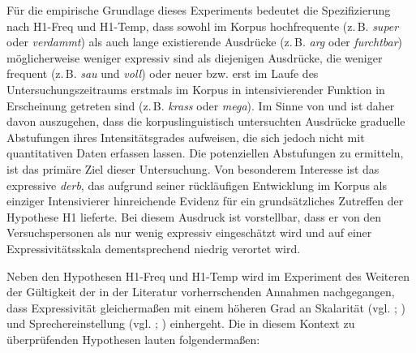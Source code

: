 \noindent Für die empirische Grundlage dieses Experiments bedeutet die Spezifizierung nach H1-Freq und H1-Temp, dass sowohl im Korpus hochfrequente (z.\,B. \textit{super} oder \textit{verdammt}) als auch lange existierende Ausdrücke (z.\,B. \textit{arg} oder \textit{furchtbar}) möglicherweise weniger expressiv sind als diejenigen Ausdrücke, die weniger frequent (z.\,B. \textit{sau} und \textit{voll}) oder neuer bzw. erst im Laufe des Untersuchungszeitraums erstmals im Korpus in intensivierender Funktion in Erscheinung getreten sind (z.\,B. \textit{krass} oder \textit{mega}). Im Sinne von \citet[87]{Biedermann.1969} und \citet[408]{Breindl.2007} ist daher davon auszugehen, dass die korpuslinguistisch untersuchten Ausdrücke graduelle Abstufungen ihres Intensitätsgrades aufweisen, die sich jedoch nicht mit quantitativen Daten erfassen lassen. Die potenziellen Abstufungen zu ermitteln, ist das primäre Ziel dieser Untersuchung. Von besonderem Interesse ist das expressive \textit{derb}, das aufgrund seiner rückläufigen Entwicklung im Korpus als einziger Intensivierer hinreichende Evidenz für ein grundsätzliches Zutreffen der Hypothese H1 lieferte. Bei diesem Ausdruck ist vorstellbar, dass er von den Versuchspersonen als nur wenig expressiv eingeschätzt wird und auf einer Expressivitätsskala dementsprechend niedrig verortet wird.






Neben den Hypothesen H1-Freq und H1-Temp wird im Experiment des Weiteren der Gültigkeit der in der Literatur vorherrschenden Annahmen nachgegangen, dass Expressivität gleichermaßen mit einem höheren Grad an Skalarität (vgl. {\citealt[22]{Paradis.1997}}; {\citealt[133]{Gutzmann.2019a}}) und Sprechereinstellung (vgl. {\citealt[315]{Lang.1983}}; {\citealt[57]{Ortner.2014}}) einhergeht. Die in diesem Kontext zu überprüfenden Hypothesen lauten folgendermaßen:


